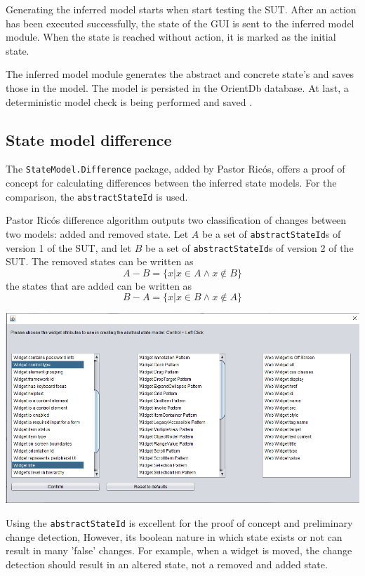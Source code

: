 Generating the inferred model starts when \testar start testing the SUT. After an action has been executed successfully, the state of the GUI is sent to the inferred model module. When the state is reached without action, it is marked as the initial state. 

The inferred model module generates the abstract and concrete state's and saves those in the model. The model is persisted in the OrientDb database. At last, a deterministic model check is being performed and saved \cite{testar-code}.

\subsection{State model difference}
The \verb|StateModel.Difference| package, added by Pastor Ricós\cite{stateDiff}, offers a proof of concept for calculating differences between the inferred state models. For the comparison, the \verb|abstractStateId| is used. 

Pastor Ricós difference algorithm\cite{stateDiff} outputs two classification of changes between two models: added and removed state. Let $A$ be a set of \verb|abstractStateId|s of version 1 of the SUT, and let $B$ be a set of \verb|abstractStateId|s of version 2 of the SUT. The removed states can be written as
\[A-B = \lbrace x | x \in A \wedge x \notin B \rbrace\]
the states that are added can be written as
\[B-A = \lbrace x | x \in B \wedge x \notin A \rbrace\]

\begingroup
\captionsetup{type=figure}
\includegraphics[scale=0.5]{images/attributes-state-model.png}
\label{fig:advance}
\endgroup

Using the \verb|abstractStateId| is excellent for the proof of concept and preliminary change detection, 
However, its boolean nature in which state exists or not can result in many 'false' changes. For example, when a widget is moved, the change detection should result in an altered state, not a removed and added state. 

